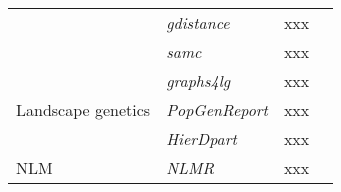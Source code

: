 \documentclass[smallextended]{svjour3}       %
\begin{document}
\begin{landscape}
\begin{center}
\begin{table}
\begin{tabularx}{0.9\linewidth}{XXXX}
      & \textit{gdistance} & xxx & \cite{vanEtten2017} \\
      & \textit{samc} & xxx & \cite{Marx2020} \\
      \hline
      \multirow{3}{*}{Landscape genetics} & \textit{graphs4lg} & xxx & \cite{Savary2020} \\
      & \textit{PopGenReport} & xxx & \cite{Adamack2014,Gruber2015} \\
      & \textit{HierDpart} & xxx & \cite{Qin2019} \\
      \hline
      NLM & \textit{NLMR} & xxx & \cite{Sciaini2018} \\
      \hline
    \end{tabularx}
  \end{table}
\end{center}

\end{landscape}



\end{document}
